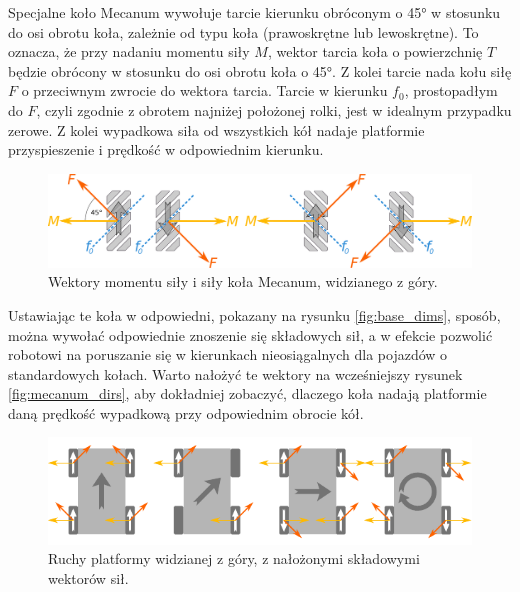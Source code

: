 		Specjalne koło Mecanum wywołuje tarcie kierunku obróconym o 45° w stosunku do osi obrotu koła, zależnie od typu koła (prawoskrętne lub lewoskrętne). 
		To oznacza, że przy nadaniu momentu siły $M$, wektor tarcia koła o powierzchnię $T$ będzie obrócony w stosunku do osi obrotu koła o 45°.
		Z kolei tarcie nada kołu siłę $F$ o przeciwnym zwrocie do wektora tarcia.
		Tarcie w kierunku $f_0$, prostopadłym do $F$, czyli zgodnie z obrotem najniżej położonej rolki, jest w idealnym przypadku zerowe.
		Z kolei wypadkowa siła od wszystkich kół nadaje platformie przyspieszenie i prędkość w odpowiednim kierunku.

		\begin{figure}[H]
		\centering
		\includegraphics[width=\textwidth]{graphics/vectors.pdf}
		\caption{Wektory momentu siły i siły koła Mecanum, widzianego z góry.}
		\label{fig:wheel_vectors}
		\end{figure} 

		Ustawiając te koła w odpowiedni, pokazany na rysunku \ref{fig:base_dims}, sposób, można wywołać odpowiednie znoszenie się składowych sił,
		a w efekcie pozwolić robotowi na poruszanie się w kierunkach nieosiągalnych dla pojazdów o standardowych kołach.
		Warto nałożyć te wektory na wcześniejszy rysunek \ref{fig:mecanum_dirs}, aby dokładniej zobaczyć, 
		dlaczego koła nadają platformie daną prędkość wypadkową przy odpowiednim obrocie kół.

		\begin{figure}[H]
		\centering
		\includegraphics[width=\textwidth]{graphics/mecanum_dirs_vect.pdf}
		\caption{Ruchy platformy widzianej z góry, z nałożonymi składowymi wektorów sił.}
		\label{fig:mecanum_dirs_vect}
		\end{figure} 

